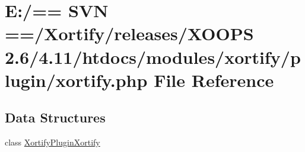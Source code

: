 \hypertarget{xortify_2plugin_2xortify_8php}{\section{E\-:/== S\-V\-N ==/\-Xortify/releases/\-X\-O\-O\-P\-S 2.6/4.11/htdocs/modules/xortify/plugin/xortify.php File Reference}
\label{xortify_2plugin_2xortify_8php}
}
\subsection*{Data Structures}
\begin{DoxyCompactItemize}
\item 
class \hyperlink{class_xortify_plugin_xortify}{Xortify\-Plugin\-Xortify}
\end{DoxyCompactItemize}
